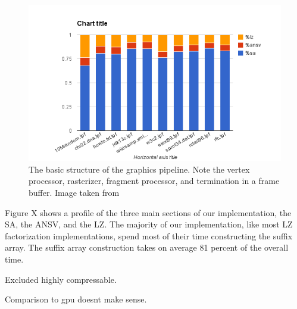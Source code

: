 \begin{figure}[ht!]
\centering
\includegraphics[width=1.0\textwidth]{images/allprof.png}
\caption{The basic structure of the graphics pipeline. Note the vertex processor, rasterizer, fragment processor, and termination in a frame buffer. Image taken from  \protect\cite{pipeline-image-ref}}
\label{fig:graphics-pipeline}
\end{figure}

Figure X shows a profile of the three main sections of our implementation, the SA, the ANSV, and the LZ.
The majority of our implementation, like most LZ factorization implementations, spend most of their time constructing the suffix array.
The suffix array construction takes on average 81 percent of the overall time.

Excluded highly compressable.

Comparison to gpu doesnt make sense.
